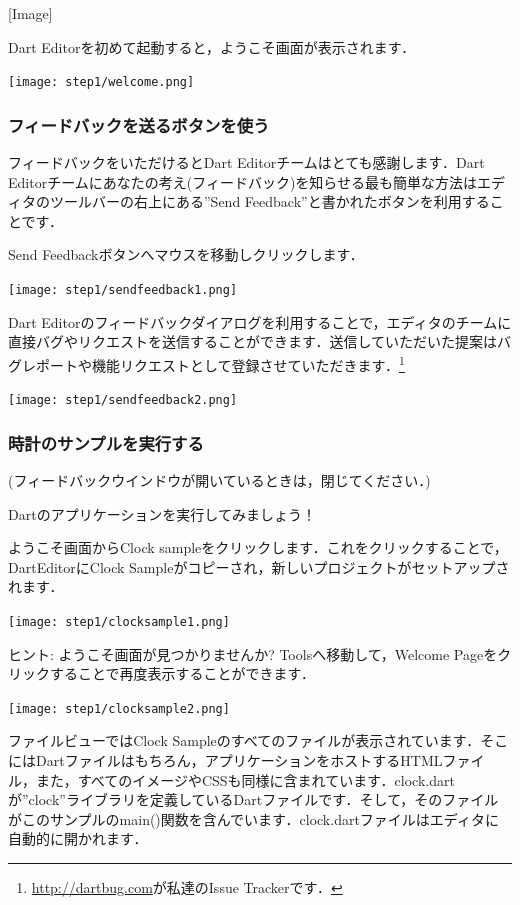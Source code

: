 [Image]

Dart Editorを初めて起動すると，ようこそ画面が表示されます．

\texttt{[image: step1/welcome.png]}

\subsubsection{フィードバックを送るボタンを使う}

フィードバックをいただけるとDart Editorチームはとても感謝します．Dart Editorチームにあなたの考え(フィードバック)を知らせる最も簡単な方法はエディタのツールバーの右上にある''Send Feedback''と書かれたボタンを利用することです．

Send Feedbackボタンへマウスを移動しクリックします．

\texttt{[image: step1/sendfeedback1.png]}

Dart Editorのフィードバックダイアログを利用することで，エディタのチームに直接バグやリクエストを送信することができます．送信していただいた提案はバグレポートや機能リクエストとして登録させていただきます．\footnote{\url{http://dartbug.com}が私達のIssue Trackerです．}

\texttt{[image: step1/sendfeedback2.png]}

\subsubsection{時計のサンプルを実行する}

(フィードバックウインドウが開いているときは，閉じてください．)

Dartのアプリケーションを実行してみましょう！

ようこそ画面からClock sampleをクリックします．これをクリックすることで，DartEditorにClock Sampleがコピーされ，新しいプロジェクトがセットアップされます．

\texttt{[image: step1/clocksample1.png]}

ヒント: ようこそ画面が見つかりませんか? Toolsへ移動して，Welcome Pageをクリックすることで再度表示することができます．

\texttt{[image: step1/clocksample2.png]}

ファイルビューではClock Sampleのすべてのファイルが表示されています．そこにはDartファイルはもちろん，アプリケーションをホストするHTMLファイル，また，すべてのイメージやCSSも同様に含まれています．clock.dartが''clock''ライブラリを定義しているDartファイルです．そして，そのファイルがこのサンプルのmain()関数を含んでいます．clock.dartファイルはエディタに自動的に開かれます．

